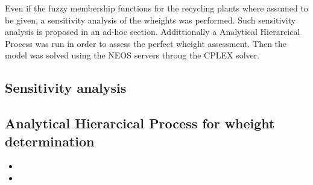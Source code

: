 \documentclass{article}
\begin{document}
Even if the fuzzy membership functions for the recycling plants where assumed to be given, a sensitivity analysis of the wheights was performed. Such sensitivity analysis is proposed in an ad-hoc section. Addittionally a Analytical Hierarcical Process was run in order to assess the perfect wheight assessment. Then the model was solved using the NEOS servers throug the CPLEX solver. 

\subsection{Sensitivity analysis}

\subsection{Analytical Hierarcical Process for wheight determination}

\begin{itemize}
	\item
	\item
\end{itemize}


\newpage 

\printbibliography
\end{document}
